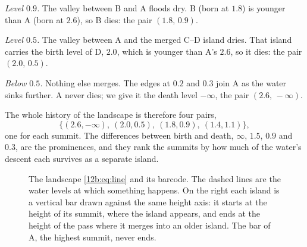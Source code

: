 \emph{Level $0.9$.} The valley between B and A floods dry. B (born at $1.8$) is younger than A (born at $2.6$),
so B dies: the pair $(1.8,\,0.9)$.

\emph{Level $0.5$.} The valley between A and the merged C--D island dries. That island carries the birth level
of D, $2.0$, which is younger than A's $2.6$, so it dies: the pair $(2.0,\,0.5)$.

\emph{Below $0.5$.} Nothing else merges. The edges at $0.2$ and $0.3$ join A as the water sinks further. A never
dies; we give it the death level $-\infty$, the pair $(2.6,\,-\infty)$.

The whole history of the landscape is therefore four pairs,
\begin{equation}
  \{(2.6,-\infty),\ (2.0,0.5),\ (1.8,0.9),\ (1.4,1.1)\},
  \label{12b:eq:line-pairs}
\end{equation}
one for each summit. The differences between birth and death, $\infty$, $1.5$, $0.9$ and $0.3$, are the
prominences, and they rank the summits by how much of the water's descent each survives as a separate island.

\begin{figure}[htbp]
\centering
{}
\caption{The landscape \eqref{12b:eq:line} and its barcode. The dashed lines are the water levels at which
something happens. On the right each island is a vertical bar drawn against the same height axis: it starts at
the height of its summit, where the island appears, and ends at the height of the pass where it merges into an
older island. The bar of A, the highest summit, never ends.}
\label{12b:fig:line}
\end{figure}

